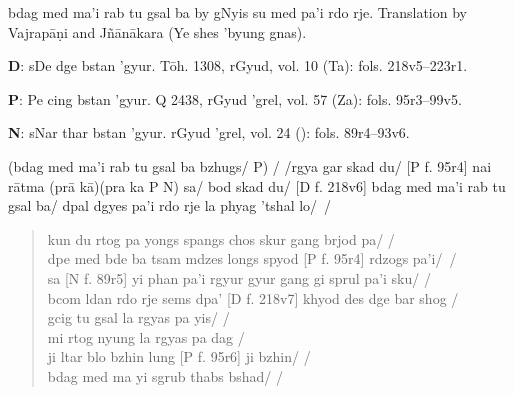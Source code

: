 \documentclass[naipra.tex]{subfiles}
\begin{document}
\noindent bdag med ma’i rab tu gsal ba by gNyis su med pa’i rdo rje. Translation by Vajrapāṇi and Jñānākara (Ye shes ’byung gnas). 

\medskip\noindent \textbf{D}: sDe dge bstan ’gyur. Tōh. 1308, rGyud, vol. 10 (Ta): fols. 218v5–223r1.

\medskip\noindent \textbf{P}: Pe cing bstan 'gyur. Q 2438, rGyud 'grel, vol. 57 (Za): fols. 95r3–99v5.

\medskip\noindent \textbf{N}: sNar thar bstan 'gyur. rGyud 'grel, vol. 24 (): fols. 89r4–93v6. 

\bigskip\noindent [D f. 218v5] [P f. 95r3] [N f. 89r4] (bdag med ma'i rab tu gsal ba bzhugs/ P) / /rgya gar skad du/ [P f. 95r4] nai rātma (prā kā)(pra ka P N) sa/ bod skad du/ [D f. 218v6] bdag med ma'i rab tu gsal ba/ dpal dgyes pa'i rdo rje la phyag 'tshal lo/~/

\begin{quote}
	kun du rtog pa yongs spangs chos skur gang brjod pa/ /\\
	dpe med bde ba tsam mdzes longs spyod [P f. 95r4] rdzogs pa'i/~/\\
	sa [N f. 89r5] yi phan pa'i rgyur gyur gang gi sprul pa'i sku/ \mbox{/}\\
	bcom ldan rdo rje sems dpa' [D f. 218v7] khyod des dge bar shog /\\

	gcig tu gsal la rgyas pa yis/ /\\
	mi rtog nyung la rgyas pa dag /\\
	ji ltar blo bzhin lung [P f. 95r6] ji bzhin/ /\\
	bdag med ma yi sgrub thabs bshad/ /
\end{quote}
\end{document}
